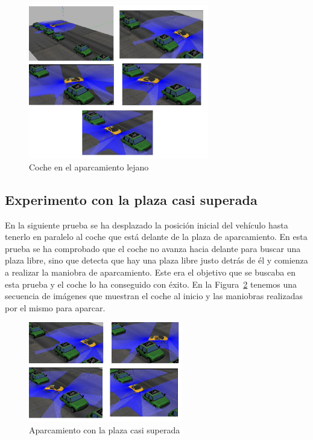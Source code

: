 \begin{figure}[H]
  \begin{center}
    \includegraphics[width=0.7\textwidth]{figures/Autopark/Experimento1.png}
		\caption{Coche en el aparcamiento lejano}
		\label{fig.Experimento1}
		\end{center}
\end{figure}


\subsection{Experimento con la plaza casi superada}
En la siguiente prueba se ha desplazado la posición inicial del vehículo hasta tenerlo en paralelo al coche que está delante de la plaza de aparcamiento. En esta prueba se ha comprobado que el coche no avanza hacia delante para buscar una plaza libre, sino que detecta que hay una plaza libre justo detrás de él y comienza a realizar la maniobra de aparcamiento. Este era el objetivo que se buscaba en esta prueba y el coche lo ha conseguido con éxito. En la Figura~\ref{fig.Experimento2} tenemos una secuencia de imágenes que muestran el coche al inicio y las maniobras realizadas por el mismo para aparcar.

\begin{figure}[H]
  \begin{center}
    \includegraphics[width=0.6\textwidth]{figures/Autopark/Experimento2.png}
		\caption{Aparcamiento con la plaza casi superada}
		\label{fig.Experimento2}
		\end{center}
\end{figure}
